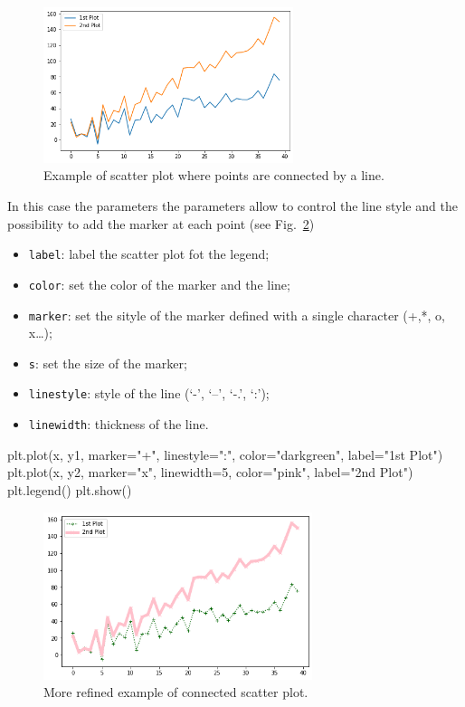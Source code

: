 \begin{ipython}
\begin{figure}[htb]
	\centering
	\includegraphics[width=0.65\textwidth]{figures/plot1}
	\caption{Example of scatter plot where points are connected by a line.}
	\label{fig:plot1}
\end{figure}

In this case the parameters the parameters allow to control the line
style and the possibility to add the marker at each point (see Fig.~\ref{fig:plot2})

\begin{itemize}
	\tightlist
	\item
	\texttt{label}: label the scatter plot fot the legend;
	\item
	\texttt{color}: set the color of the marker and the line;
	\item
	\texttt{marker}: set the sityle of the marker defined with a single
	character (+,*, o, x\ldots{});
	\item
	\texttt{s}: set the size of the marker;
	\item
	\texttt{linestyle}: style of the line (`-', `--', `-.', `:');
	\item
	\texttt{linewidth}: thickness of the line.
\end{itemize}

\begin{ipython}
plt.plot(x, y1, marker="+", linestyle=":", color="darkgreen", label="1st Plot")
plt.plot(x, y2, marker="x", linewidth=5, color="pink", label="2nd Plot")
plt.legend()
plt.show()
\end{ipython}

\begin{figure}[htb]
	\centering
	\includegraphics[width=0.7\textwidth]{figures/plot2}
	\caption{More refined example of connected scatter plot.}
	\label{fig:plot2}
\end{figure}


\end{ipython}
